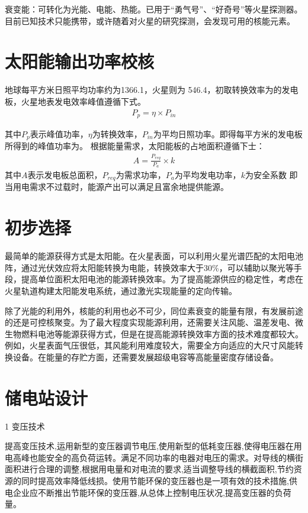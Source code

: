 衰变能：可转化为光能、电能、热能。已用于“勇气号”、“好奇号”等火星探测器。目前已知技术只能携带，或许随着对火星的研究探测，会发现可用的核能元素。

\clearpage
\section{太阳能输出功率校核}
\label{sec:energy-solar-power}

地球每平方米日照平均功率约为1366.1\WattPerMetreSquared ，火星则为 546.4\WattPerMetreSquared ，初取转换效率为的发电板，火星地表发电效率峰值遵循下式。
\begin{align}
  P_p = \eta \times P_{in}
\end{align}

其中$P_p$表示峰值功率，$\eta$为转换效率，$P_{in}$为平均日照功率。即得每平方米的发电板所得到的峰值功率为\SolarPeakRate 。
根据能量需求，太阳能板的占地面积遵循下士：
\begin{align}
  \label{eqn:solar-area}
  A = \frac{P_{req}}{P_a} \times k
\end{align}
其中$A$表示发电板总面积，$P_{req}$为需求功率，$P_a$为平均发电功率，$k$为安全系数
即当用电需求不过载时，能源产出可以满足且富余地提供能源。

\section{初步选择}
\label{sec:energy-choice}

最简单的能源获得方式是太阳能。在火星表面，可以利用火星光谱匹配的太阳电池阵，通过光伏效应将太阳能转换为电能，转换效率大于30\%，可以辅助以聚光等手段，提高单位面积太阳电池的能源转换效率。为了提高能源供应的稳定性，考虑在火星轨道构建太阳能发电系统，通过激光实现能量的定向传输。

除了光能的利用外，核能的利用也必不可少，同位素衰变的能量有限，有发展前途的还是可控核聚变。为了最大程度实现能源利用，还需要关注风能、温差发电、微生物燃料电池等能源获得方式，但是在提高能源转换效率方面的技术难度都较大。例如，火星表面气压很低，其风能利用难度较大，需要全方向适应的大尺寸风能转换设备。在能量的存贮方面，还需要发展超级电容等高能量密度存储设备。

\clearpage
\section{储电站设计}
\label{sec:energy-power-station}

1 变压技术

提高变压技术,运用新型的变压器调节电压,使用新型的低耗变压器,使得电压器在用电高峰也能安全的高负荷运转。满足不同功率的电器对电压的需求。对导线的横街面积进行合理的调整,根据用电量和对电流的要求,适当调整导线的横截面积,节约资源的同时提高效率降低线损。使用节能环保的变压器也是一项有效的技术措施,供电企业应不断推出节能环保的变压器,从总体上控制电压状况,提高变压器的负荷量。

